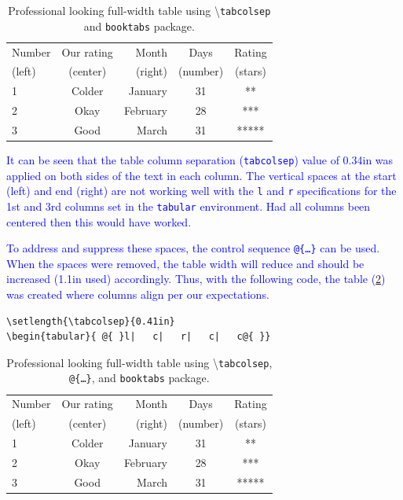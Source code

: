 \documentclass[phd]{ndsu-thesis-2022}
\newcommand\italk[1]{\textcolor{blue}{#1}}  %
\newcommand\cmd[1]{\textbackslash\texttt{#1}}  %
\newcommand\vb[1]{\textcolor{blue}{\texttt{#1}}}%
\begin{document}
\begin{table}[ht!]
\centering
\caption{Professional looking full-width table using \cmd{tabcolsep} and \texttt{booktabs} package.}
\setlength{\tabcolsep}{0.34in}
\begin{tabular}{ l|   c|   r|   c|   c}
\toprule
Number & Our rating & Month & Days & Rating\\
(left) & (center)   & (right) & (number) & (stars)\\
\midrule
1 & Colder & January & 31 & **\\
2 & Okay   & February & 28 & ***\\
3 & Good   & March & 31 & *****\\
\bottomrule
\end{tabular}
\label{tab23}
\end{table}

\italk{It can be seen that the table column separation (\vb{tabcolsep}) value of 0.34in was applied on both sides of the text in each column. The vertical spaces at the start (left) and end (right) are not working well with the \vb{l} and \vb{r} specifications for the 1st and 3rd columns set in the \vb{tabular} environment. Had all columns been centered then this would have worked.}

\italk{To address and suppress these spaces, the control sequence \vb{@\{\ldots\}} can be used. When the spaces were removed, the table width will reduce and should be increased (1.1in used) accordingly. Thus, with the following code, the table (\cref{tab24}) was created where columns align per our expectations.
}

{\singlespacing
\begin{verbatim}
\setlength{\tabcolsep}{0.41in}
\begin{tabular}{ @{ }l|   c|   r|   c|   c@{ }}
\end{verbatim}
}

\begin{table}[ht!]
\centering
\caption{Professional looking full-width table using \cmd{tabcolsep}, \texttt{@\{\ldots\}}, and \texttt{booktabs} package.}
\setlength{\tabcolsep}{0.41in}
\begin{tabular}{ @{ }l|   c|   r|   c|   c@{ }}
\toprule
Number & Our rating & Month & Days & Rating\\
(left) & (center)   & (right) & (number) & (stars)\\
\midrule
1 & Colder & January & 31 & **\\
2 & Okay   & February & 28 & ***\\
3 & Good   & March & 31 & *****\\
\bottomrule
\end{tabular}
\label{tab24}
\end{table}
\end{document}
